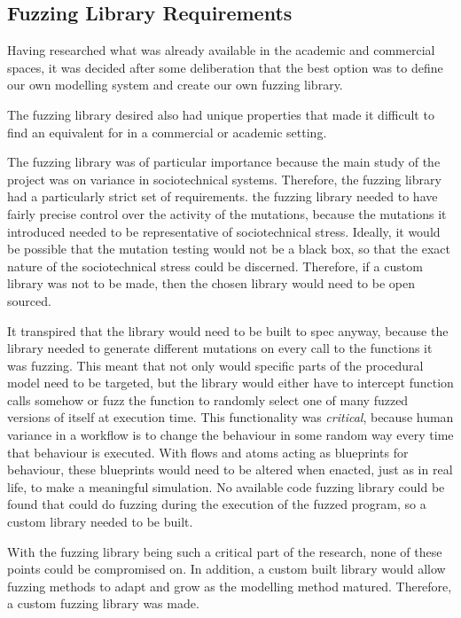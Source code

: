 \documentclass[11pt, twocolumn]{article}
\begin{document}
\subsection{Fuzzing Library Requirements}\label{planning_fuzzing}
Having researched what was already available in the academic and commercial spaces, it was decided after some deliberation that the best option was to define our own modelling system and create our own fuzzing library.  \par 
The fuzzing library desired also had unique properties that made it difficult to find an equivalent for in a commercial or academic setting. \par
The fuzzing library was of particular importance because the main study of the project was on variance in sociotechnical systems. Therefore, the fuzzing library had a particularly strict set of requirements. the fuzzing library needed to have fairly precise control over the activity of the mutations, because the mutations it introduced needed to be representative of sociotechnical stress. Ideally, it would be possible that the mutation testing would not be a black box, so that the exact nature of the sociotechnical stress could be discerned. Therefore, if a custom library was not to be made, then the chosen library would need to be open sourced. \par
It transpired that the library would need to be built to spec anyway, because the library needed to generate different mutations on every call to the functions it was fuzzing. This meant that not only would specific parts of the procedural model need to be targeted, but the library would either have to intercept function calls somehow or fuzz the function to randomly select one of many fuzzed versions of itself at execution time. This functionality was \emph{critical}, because human variance in a workflow is to change the behaviour in some random way every time that behaviour is executed. With flows and atoms acting as blueprints for behaviour, these blueprints would need to be altered when enacted, just as in real life, to make a meaningful simulation. No available code fuzzing library could be found that could do fuzzing during the execution of the fuzzed program, so a custom library needed to be built. \par
With the fuzzing library being such a critical part of the research, none of these points could be compromised on. In addition, a custom built library would allow fuzzing methods to adapt and grow as the modelling method matured. Therefore, a custom fuzzing library was made. \par
\end{document}
